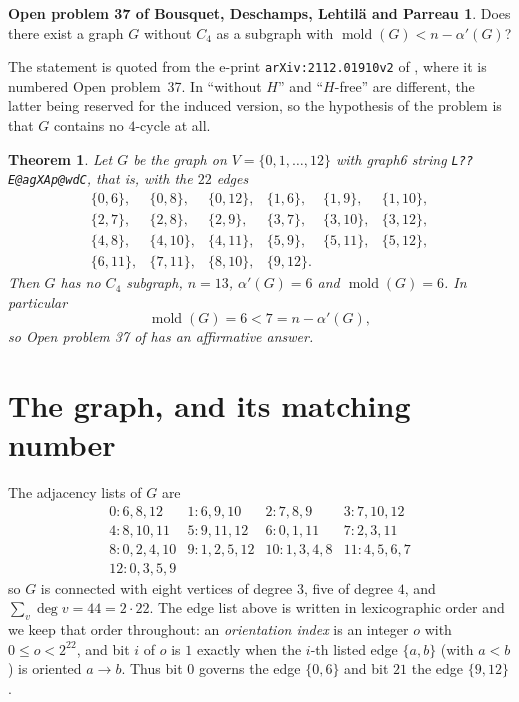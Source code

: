 \documentclass[11pt]{amsart}
\newtheorem{theorem}{Theorem}
\theoremstyle{definition}
\newtheorem*{problem}{Open problem 37 of Bousquet, Deschamps, Lehtil\"a and Parreau}
\theoremstyle{remark}
\DeclareMathOperator{\mold}{mold}
\begin{document}
\begin{problem}
Does there exist a graph $G$ without $C_4$ as a subgraph with
$\mold(G)<n-\alpha'(G)$?
\end{problem}

\noindent The statement is quoted from the e-print \texttt{arXiv:2112.01910v2}
of \cite{BDLP}, where it is numbered Open problem~37. In
\cite{BDLP} ``without $H$'' and ``$H$-free'' are different, the latter being
reserved for the induced version, so the hypothesis of the problem is that $G$
contains no $4$-cycle at all.

\begin{theorem}\label{thm:main}
Let $G$ be the graph on $V=\{0,1,\dots,12\}$ with graph6 string
\texttt{L??E@agXAp@wdC}, that is, with the $22$ edges
\[
\begin{array}{llllll}
 \{0,6\},&\{0,8\},&\{0,12\},&\{1,6\},&\{1,9\},&\{1,10\},\\
 \{2,7\},&\{2,8\},&\{2,9\},&\{3,7\},&\{3,10\},&\{3,12\},\\
 \{4,8\},&\{4,10\},&\{4,11\},&\{5,9\},&\{5,11\},&\{5,12\},\\
 \{6,11\},&\{7,11\},&\{8,10\},&\{9,12\}. & &
\end{array}
\]
Then $G$ has no $C_4$ subgraph, $n=13$, $\alpha'(G)=6$ and $\mold(G)=6$. In
particular
\[
 \mold(G)=6<7=n-\alpha'(G),
\]
so Open problem 37 of \cite{BDLP} has an affirmative answer.
\end{theorem}

\section{The graph, and its matching number}\label{sec:obj}

The adjacency lists of $G$ are
\[
\begin{array}{llll}
 0:6,8,12 & 1:6,9,10 & 2:7,8,9 & 3:7,10,12\\
 4:8,10,11 & 5:9,11,12 & 6:0,1,11 & 7:2,3,11\\
 8:0,2,4,10 & 9:1,2,5,12 & 10:1,3,4,8 & 11:4,5,6,7\\
 12:0,3,5,9 & & &
\end{array}
\]
so $G$ is connected with eight vertices of degree $3$, five of degree $4$, and
$\sum_v\deg v=44=2\cdot22$. The edge list above is written in lexicographic
order and we keep that order throughout: an \emph{orientation index} is an
integer $o$ with $0\le o<2^{22}$, and bit $i$ of $o$ is $1$ exactly when the
$i$-th listed edge $\{a,b\}$ (with $a<b$) is oriented $a\to b$. Thus bit $0$
governs the edge $\{0,6\}$ and bit $21$ the edge $\{9,12\}$.
\end{document}
